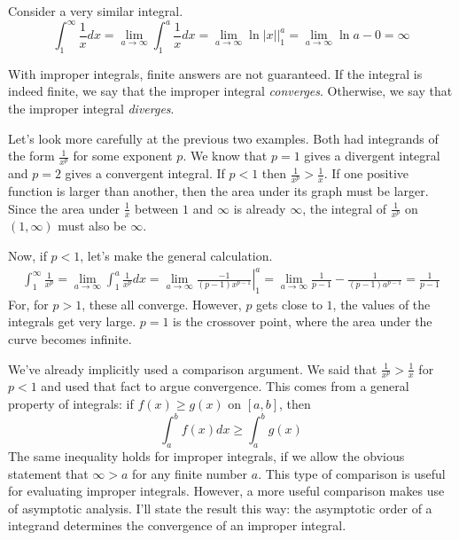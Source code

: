\documentclass[fleqn]{report}
\begin{document}
\begin{example}
Consider a very similar integral.
\begin{equation*}
\int_1^\infty \frac{1}{x} dx = \lim_{a \rightarrow \infty}
\int_1^a \frac{1}{x} dx = \lim_{a \rightarrow \infty}
\left. \ln |x| \right|_1^a = \lim_{a \rightarrow \infty}
\ln a - 0 = \infty 
\end{equation*}
\end{example}

\begin{defn}
With improper integrals, finite answers are not guaranteed.
If the integral is indeed finite, we say that the improper
integral \emph{converges}. Otherwise, we say that the
improper integral \emph{diverges}. 
\end{defn}

\begin{example}
Let's look more carefully at the previous two examples. Both
had integrands of the form $\frac{1}{x^p}$ for some exponent
$p$. We know that $p=1$ gives a divergent integral and $p=2$
gives a convergent integral. If $p < 1$ then $\frac{1}{x^p}
> \frac{1}{x}$. If one positive function is larger than
another, then the area under its graph must be larger.
Since the area under $\frac{1}{x}$ between $1$ and $\infty$ is
already $\infty$, the integral of $\frac{1}{x^p}$ on
$(1,\infty)$ must also be $\infty$. 

Now, if $p<1$, let's make the general calculation.
\begin{align*}
\int_1^\infty \frac{1}{x^p} = \lim_{a \rightarrow \infty}
\int_1^a \frac{1}{x^p} dx = \lim_{a \rightarrow \infty} \left.
\frac{-1}{(p-1)x^{p-1}} \right|_1^a = \lim_{a \rightarrow
\infty} \frac{1}{p-1} -\frac{1}{(p-1)a^{p-1}} = \frac{1}{p-1}
\end{align*}
For, for $p>1$, these all converge. However, $p$ gets close
to $1$, the values of the integrals get very large. $p=1$ is
the crossover point, where the area under the curve becomes
infinite.
\end{example}

We've already implicitly used a comparison argument. We said
that $\frac{1}{x^p} > \frac{1}{x}$ for $p<1$ and used that
fact to argue convergence. This comes from a general property
of integrals: if $f(x) \geq g(x)$ on $[a,b]$, then 
\begin{equation*}
\int_a^b f(x) dx \geq \int_a^b g(x)
\end{equation*}
The same inequality holds for improper integrals, if we allow
the obvious statement that $\infty > a$ for any finite number
$a$. This type of comparison is useful for evaluating
improper integrals. However, a more useful comparison makes
use of asymptotic analysis. I'll state the result this way:
the asymptotic order of a integrand determines the convergence
of an improper integral. 
\end{document}
